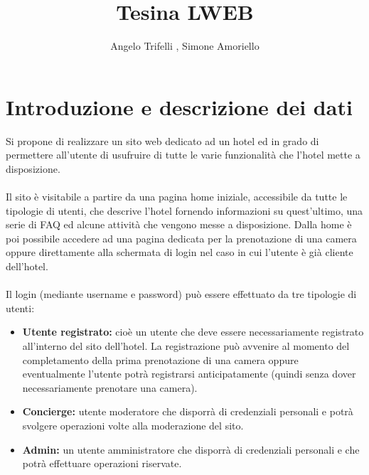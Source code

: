 \documentclass [a4paper, 12pt]{book}
\begin{document}
\author{Angelo Trifelli , Simone Amoriello}
\title{Tesina LWEB}
\maketitle
\tableofcontents

\chapter{Introduzione e descrizione dei dati}

Si propone di realizzare un sito web dedicato ad un hotel ed in grado di permettere all'utente di usufruire di tutte le varie funzionalità che l'hotel mette a disposizione.\\\\
Il sito è visitabile a partire da una pagina home iniziale, accessibile da tutte le tipologie di utenti, che descrive l'hotel fornendo informazioni su quest'ultimo, una serie di FAQ ed alcune attività che vengono messe a disposizione. Dalla home è poi possibile accedere ad una pagina dedicata per la prenotazione di una camera oppure direttamente alla schermata di login nel caso in cui l'utente è già cliente dell'hotel.\\\\
Il login (mediante username e password) può essere effettuato da tre tipologie di utenti:
\begin{itemize}
\item \textbf{Utente registrato:} cioè un utente che deve essere necessariamente registrato all'interno del sito dell'hotel. La registrazione può avvenire al momento del completamento della prima prenotazione di una camera oppure eventualmente l'utente potrà registrarsi anticipatamente (quindi senza dover necessariamente prenotare una camera).
\item \textbf{Concierge:} utente moderatore che disporrà di credenziali personali e potrà svolgere operazioni volte alla moderazione del sito.
\item \textbf{Admin:} un utente amministratore che disporrà di credenziali personali e che potrà effettuare operazioni riservate.
\end{itemize}
\end{document}
